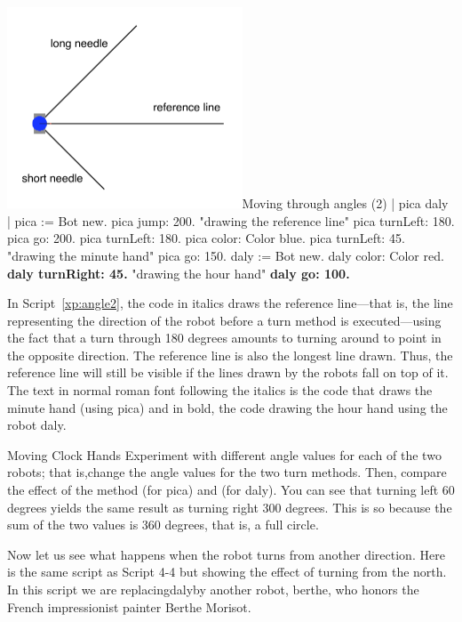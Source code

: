 \documentclass[a4paper,10pt,twoside]{book}
\begin{document}
\begin{scriptfigwithsize}[0.4]{\includegraphics[width=7cm]{twoAnglesAnnotated}}{Moving through angles (2)}\label{xp:angle2}
	| pica daly | 
	pica := Bot new. 
	pica jump: 200. 
	"drawing the reference line" 
	pica turnLeft: 180. 
	pica go: 200. 
	pica turnLeft: 180. 
	pica color: Color blue. 
	pica turnLeft: 45.       
	"drawing the minute hand" 
	pica go: 150. 
	daly := Bot new. 
	daly color: Color red. 
	\textbf{daly turnRight: 45.}  
	"drawing the hour hand" 
	\textbf{daly go: 100.} 
\end{scriptfigwithsize}


In Script~\ref{xp:angle2}, the code in italics draws the reference line—that is, the line representing 
the direction of the robot before a turn method is executed—using the fact that a turn through 
180 degrees amounts to turning around to point in the opposite direction. The reference line 
is also the longest line drawn. Thus, the reference line will still be visible if the lines drawn by 
the robots fall on top of it. The text in normal roman font following the italics is the code that 
draws the minute hand (using pica) and in bold, the code drawing the hour hand using the 
robot daly. 

\begin{exonofigtitle}{Moving Clock Hands}
Experiment with different angle values for each of the two robots; that is,change the angle values for the two turn 
methods. Then, compare the effect of the method  (for pica) and  (for daly). 
You can see that turning left 60 degrees yields the same result as turning right 300 degrees. This is so because 
the sum of the two values is 360 degrees, that is, a full circle. 
\end{exonofigtitle}


Now let us see what happens when the robot turns from another direction. Here is the 
same script as Script 4-4 but showing the effect of turning from the north. In this script we are 
replacingdalyby another robot, berthe, who honors the French impressionist painter Berthe 
Morisot. 
\end{document}
